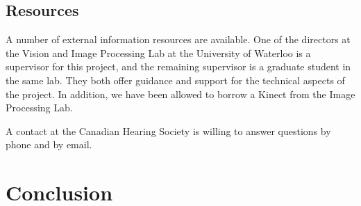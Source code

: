 \documentclass[12pt]{article}
\begin{document}
\subsection{Resources}
A number of external information resources are available. One of the directors at the Vision and Image Processing Lab at the University of Waterloo is a supervisor for this project, and the remaining supervisor is a graduate student in the same lab. They both offer guidance and support for the technical aspects of the project. In addition, we have been allowed to borrow a Kinect from the Image Processing Lab.

A contact at the Canadian Hearing Society is willing to answer questions by phone and by email.

\newpage
\section{Conclusion}

\newpage
{}

\newpage
{}
\end{document}
